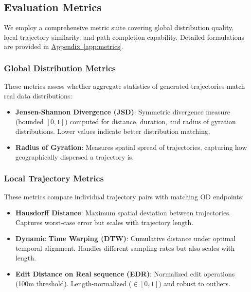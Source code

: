 \subsection{Evaluation Metrics}
\label{sec:eval-metrics}

We employ a comprehensive metric suite covering global distribution quality, local trajectory similarity, and path completion capability. Detailed formulations are provided in \hyperref[app:metrics]{Appendix~\ref*{app:metrics}}.

\subsubsection{Global Distribution Metrics}

These metrics assess whether aggregate statistics of generated trajectories match real data distributions:

\begin{itemize}[noitemsep,topsep=0pt]
\item \textbf{Jensen-Shannon Divergence (JSD)}: Symmetric divergence measure (bounded $[0, 1]$) computed for distance, duration, and radius of gyration distributions. Lower values indicate better distribution matching.
\item \textbf{Radius of Gyration}: Measures spatial spread of trajectories, capturing how geographically dispersed a trajectory is.
\end{itemize}

\subsubsection{Local Trajectory Metrics}

These metrics compare individual trajectory pairs with matching OD endpoints:

\begin{itemize}[noitemsep,topsep=0pt]
\item \textbf{Hausdorff Distance}: Maximum spatial deviation between trajectories. Captures worst-case error but scales with trajectory length.
\item \textbf{Dynamic Time Warping (DTW)}: Cumulative distance under optimal temporal alignment. Handles different sampling rates but also scales with length.
\item \textbf{Edit Distance on Real sequence (EDR)}: Normalized edit operations (100m threshold). Length-normalized ($\in [0,1]$) and robust to outliers.
\end{itemize}

